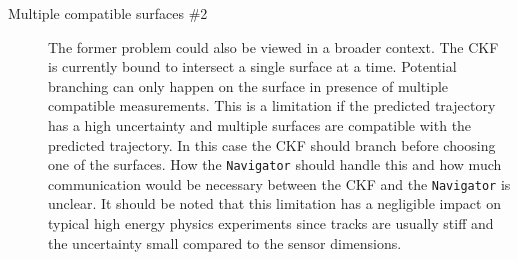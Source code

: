 \begin{description}
    \item[Multiple compatible surfaces \#2] The former problem could also be viewed in a broader context. The CKF is currently bound to intersect a single surface at a time. Potential branching can only happen on the surface in presence of multiple compatible measurements. This is a limitation if the predicted trajectory has a high uncertainty and multiple surfaces are compatible with the predicted trajectory. In this case the CKF should branch before choosing one of the surfaces. How the \texttt{Navigator} should handle this and how much communication would be necessary between the CKF and the \texttt{Navigator} is unclear. It should be noted that this limitation has a negligible impact on typical high energy physics experiments since tracks are usually stiff and the uncertainty small compared to the sensor dimensions. 
\end{description}
